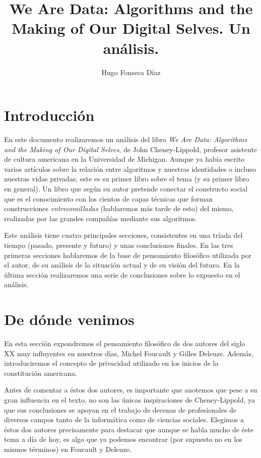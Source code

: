 \documentclass[11pt]{article}
\begin{document}
\title{We Are Data: Algorithms and the Making of Our Digital Selves. Un análisis.}
\author{Hugo Fonseca Díaz\\ }
\maketitle
\section{Introducción}
En este documento realizaremos un análisis del libro \textit{We Are Data: Algorithms and the Making of Our Digital Selves}, de John Cheney-Lippold, profesor asistente de cultura americana en la Universidad de Michigan. Aunque ya había escrito varios artículos sobre la relación entre algoritmos y nuestras identidades o incluso nuestras vidas privadas, este es su primer libro sobre el tema (y su primer libro en general). Un libro que según su autor pretende conectar el constructo social que es el conocimiento con los cientos de capas técnicas que forman construcciones \textit{entrecomilladas} (hablaremos más tarde de esto) del mismo, realizadas por las grandes compañías mediante sus algoritmos.

Este análisis tiene cuatro principales secciones, consistentes en una tríada del tiempo (pasado, presente y futuro) y unas conclusiones finales. En las tres primeras secciones hablaremos de la base de pensamiento filosófico utilizada por el autor, de su análisis de la situación actual y de su visión del futuro. En la última sección realizaremos una serie de conclusiones sobre lo expuesto en el análisis.
\section{De dónde venimos}
En esta sección expondremos el pensamiento filosófico de dos autores del siglo XX muy influyentes en nuestros días, Michel Foucault y Gilles Deleuze. Además, introduciremos el concepto de privacidad utilizado en los inicios de la constitución americana.

Antes de comentar a éstos dos autores, es importante que anotemos que pese a su gran influencia en el texto, no son las únicas inspiraciones de Cheney-Lippold, ya que sus conclusiones se apoyan en el trabajo de decenas de profesionales de diversos campos tanto de la informática como de ciencias sociales. Elegimos a éstos dos autores precisamente para destacar que aunque se habla mucho de éste tema a día de hoy, es algo que ya podemos encontrar (por supuesto no en los mismos términos) en Foucault y Deleuze. 
\end{document}
